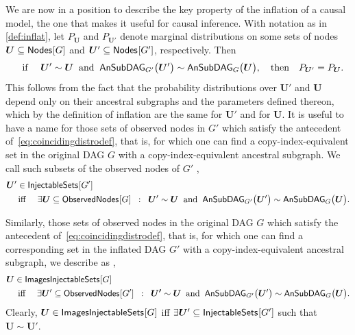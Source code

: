 We are now in a position to describe the key property of the inflation of a causal model, the one that makes it useful for causal inference. With notation as in \cref{def:inflat}, let %
$P_{\bm{U}}$ and $P_{\bm{U}'}$ denote marginal distributions on some sets of nodes $\bm{U}\subseteq\nodes{G}$ and $\bm{U}'\subseteq\nodes{G'}$, respectively. Then
\begin{align}\label{eq:coincidingdistrodef}
\quad\text{if }\quad \bm{U}'\sim \bm{U} \;\;\text{and}\;\; \ansubgraph[G']{\bm{U}'}\sim\ansubgraph[G]{\bm{U}}, \quad\text{then}\quad P_{\bm{U}'}=P_{\bm{U}}.
\end{align}
This follows from the fact that the probability distributions over $\bm{U}'$ and $\bm{U}$ depend only on their ancestral subgraphs and the parameters defined thereon, which by the definition of inflation are the same for $\bm{U}'$ and for $\bm{U}$.
It is useful to have a name for those sets of observed nodes in $G'$ which satisfy the antecedent of~\cref{eq:coincidingdistrodef}, that is, for which one can find a copy-index-equivalent set in the original DAG $G$ with a copy-index-equivalent ancestral subgraph.  We call such subsets of the observed nodes of $G'$ ,
\begin{align}\begin{split}\label{eq:definjectable}
&\bm{U}'\in\SmallNamedFunction{InjectableSets}{G'} \\
&\quad\text{ iff }\quad \exists \bm{U}\subseteq \SmallNamedFunction{ObservedNodes}{G} \;\; :\;\; \bm{U}'\sim\bm{U} \;\;\text{and}\;\; \ansubgraph[G']{\bm{U}'}\sim\ansubgraph[G]{\bm{U}}.
\end{split}\end{align}

Similarly,  those sets of observed nodes in the original DAG $G$ which satisfy the antecedent of~\cref{eq:coincidingdistrodef}, that is, for which one can find a corresponding set in the inflated DAG $G'$ with a copy-index-equivalent ancestral subgraph, we describe as ,
\begin{align}\begin{split}\label{eq:defimageinjectable}
& \bm{U}\in\SmallNamedFunction{ImagesInjectableSets}{G} \\
& \quad\text{ iff }\quad \exists \bm{U}' \subseteq \SmallNamedFunction{ObservedNodes}{G'} \;\; :\;\; \bm{U'}\sim\bm{U} \;\;\text{and}\;\; \ansubgraph[G']{\bm{U}'}\sim\ansubgraph[G]{\bm{U}}.
\end{split}\end{align}
Clearly, $\bm{U}\in\SmallNamedFunction{ImagesInjectableSets}{G}$ iff $\exists \bm{U}' \subseteq \SmallNamedFunction{InjectableSets}{G'}$ such that $\bm{U}\sim \bm{U}'$.


